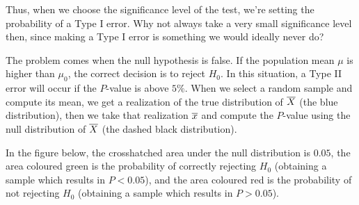 \begin{center}
\end{center}

Thus, when we choose the significance level of the test, we're setting the probability of a Type I error. Why not always take a very small significance level then, since making a Type I error is something we would ideally never do?

The problem comes when the null hypothesis is false. If the population mean $\mu$ is higher than $\mu_0$, the correct decision is to reject $H_0$. In this situation, a Type II error will occur if the $P$-value is above $5\%$. When we select a random sample and compute its mean, we get a realization of the true distribution of ${\overline{X}}$ (the blue distribution), then we take that realization ${\overline{x}}$ and compute the $P$-value using the null distribution of ${\overline{X}}$ (the dashed black distribution). 

In the figure below, the crosshatched area under the null distribution is $0.05$, the area coloured green is the probability of correctly rejecting $H_0$ (obtaining a sample which results in $P < 0.05$), and the area coloured red is the probability of not rejecting $H_0$ (obtaining a sample which results in $P > 0.05$).

